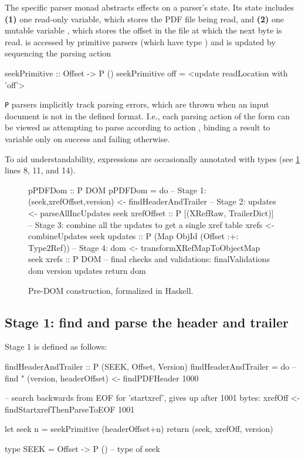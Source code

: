 The specific parser monad  abstracts effects on a parser's state.
%
Its state includes %
\textbf{(1)} one read-only variable, which stores the PDF file being read, and %
\textbf{(2)} one mutable variable \rdloc{}, which stores the offset in the file at which the next byte is read.
%
\rdloc{} is accessed by primitive parsers (which have type )
and is updated by sequencing the parsing action
\begin{codeNoExecute}
  seekPrimitive :: Offset -> P ()
  seekPrimitive off = <update readLocation with 'off'>
\end{codeNoExecute}
%
%
\texttt{P} parsers implicitly track parsing errors, which are thrown when an input document is not in the defined format.
%
I.e., each parsing action of the form  can be viewed as attempting to parse according to action , binding a result to variable  only on success and failing otherwise.

To aid understandability, expressions are occasionally annotated with types (see \cref{fig:spec} lines 8, 11, and 14).

\begin{figure}[t]
\centering
\lstset{numbers=right}
\begin{code}
pPDFDom :: P DOM
pPDFDom =
    do
    -- Stage 1:
    (seek,xrefOffset,version) <- findHeaderAndTrailer
    -- Stage 2:
    updates <- parseAllIncUpdates seek xrefOffset
               :: P [(XRefRaw, TrailerDict)]
    -- Stage 3: combine all the updates to get a single xref table
    xrefs <- combineUpdates seek updates
             :: P (Map ObjId (Offset :+: Type2Ref))
    -- Stage 4:
    dom <- transformXRefMapToObjectMap seek xrefs
           :: P DOM
    -- final checks and validations:
    finalValidations dom version updates
    return dom
\end{code}
\caption{Pre-DOM construction, formalized in Haskell.}
\label{fig:spec}
\end{figure}


\subsection{Stage 1: find and parse the header and trailer}
\label{sec:stage-1}

Stage 1 is defined as follows:
\begin{code}
findHeaderAndTrailer :: P (SEEK, Offset, Version)
findHeaderAndTrailer =
    do
    -- find "%
    (version, headerOffset) <- findPDFHeader 1000

    -- search backwards from EOF for 'startxref', gives up after 1001 bytes:
    xrefOff <- findStartxrefThenParseToEOF 1001
    
    let seek n = seekPrimitive (headerOffset+n)
    return (seek, xrefOff, version)
    
type SEEK = Offset -> P () -- type of seek
\end{code}

